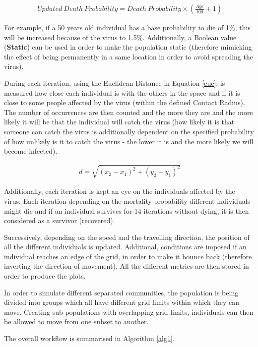 \useshortskip
\begin{align}
\ Updated\:Death\:Probability = Death\:Probability \times (\frac{Age}{100} + 1) 
\end{align}
\useshortskip

For example, if a 50 years old individual has a base probability to die of 1\%, this will be increased because of the virus to 1.5\%. Additionally, a Boolean value (\textbf{Static}) can be used in order to make the population static (therefore mimicking the effect of being permanently in a same location in order to avoid spreading the virus).

During each iteration, using the Euclidean Distance in Equation \ref{euc}, is measured how close each individual is with the others in the space and if it is close to some people affected by the virus (within the defined Contact Radius). The number of occurrences are then counted and the more they are and the more likely it will be that the individual will catch the virus (how likely it is that someone can catch the virus is additionally dependent on the specified probability of how unlikely is it to catch the virus - the lower it is and the more likely we will become infected).

\useshortskip
\begin{align}
\ d = \sqrt{(x_{2}-x_{1})^{2}+(y_{2}-y_{1})^{2}}
\label{euc}
\end{align}
\useshortskip

Additionally, each iteration is kept an eye on the individuals affected by the virus. Each iteration depending on the mortality probability different individuals might die and if an individual survives for 14 iterations without dying, it is then considered as a survivor (recovered).

Successively, depending on the speed and the travelling direction, the position of all the different individuals is updated. Additional, conditions are imposed if an individual reaches an edge of the grid, in order to make it bounce back (therefore inverting the direction of movement). All the different metrics are then stored in order to produce the plots.

In order to simulate different separated communities, the population is being divided into groups which all have different grid limits within which they can move. Creating sub-populations with overlapping grid limits, individuals can then be allowed to move from one subset to another.

The overall workflow is summarised in Algorithm \ref{alg1}.

